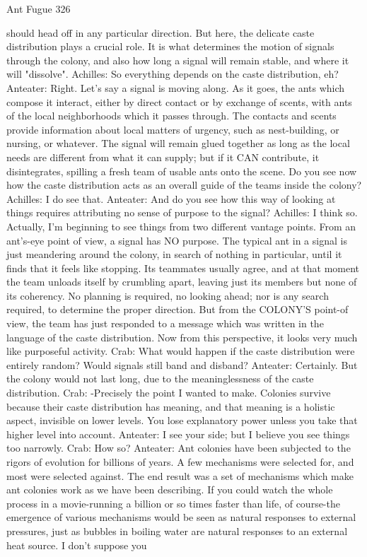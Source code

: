 Ant Fugue                                                                                326

   should head off in any particular direction. But here, the delicate caste distribution
   plays a crucial role. It is what determines the motion of signals through the colony,
   and also how long a signal will remain stable, and where it will "dissolve".
Achilles: So everything depends on the caste distribution, eh?
Anteater: Right. Let's say a signal is moving along. As it goes, the ants which compose it
   interact, either by direct contact or by exchange of scents, with ants of the local
   neighborhoods which it passes through. The contacts and scents provide information
   about local matters of urgency, such as nest-building, or nursing, or whatever. The
   signal will remain glued together as long as the local needs are different from what it
   can supply; but if it CAN contribute, it disintegrates, spilling a fresh team of usable
   ants onto the scene. Do you see now how the caste distribution acts as an overall
   guide of the teams inside the colony?
Achilles: I do see that.
Anteater: And do you see how this way of looking at things requires attributing no sense
   of purpose to the signal?
Achilles: I think so. Actually, I'm beginning to see things from two different vantage
   points. From an ant's-eye point of view, a signal has NO purpose. The typical ant in a
   signal is just meandering around the colony, in search of nothing in particular, until it
   finds that it feels like stopping. Its teammates usually agree, and at that moment the
   team unloads itself by crumbling apart, leaving just its members but none of its
   coherency. No planning is required, no looking ahead; nor is any search required, to
   determine the proper direction. But from the COLONY'S point-of view, the team has
   just responded to a message which was written in the language of the caste
   distribution. Now from this perspective, it looks very much like purposeful activity.
Crab: What would happen if the caste distribution were entirely random? Would signals
   still band and disband?
Anteater: Certainly. But the colony would not last long, due to the meaninglessness of the
   caste distribution.
Crab: -Precisely the point I wanted to make. Colonies survive because their caste
   distribution has meaning, and that meaning is a holistic aspect, invisible on lower
   levels. You lose explanatory power unless you take that higher level into account.
Anteater: I see your side; but I believe you see things too narrowly.
Crab: How so?
Anteater: Ant colonies have been subjected to the rigors of evolution for billions of years.
   A few mechanisms were selected for, and most were selected against. The end result
   was a set of mechanisms which make ant colonies work as we have been describing.
   If you could watch the whole process in a movie-running a billion or so times faster
   than life, of course-the emergence of various mechanisms would be seen as natural
   responses to external pressures, just as bubbles in boiling water are natural responses
   to an external heat source. I don't suppose you




